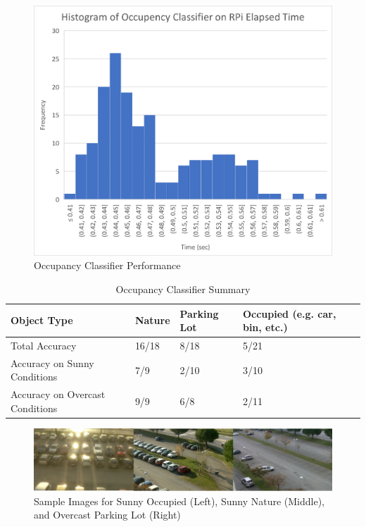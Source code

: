 \documentclass[12pt, titlepage]{article}
\begin{document}
\begin{figure}[h!]
  \begin{center} 
  \caption{Occupancy Classifier Performance}
  \label{fig:occClassifierPerf}
        \includegraphics[width=1\textwidth]{VnVReport/OccupencyClassifierPerformance.png}
  \end{center}
\end{figure}


\begin{table}[!h]
\begin{center}
\caption {Occupancy Classifier Summary}
\label{tab:OccClassifierSummary}
\begin{tabular}{ | m{5cm} | m{3cm} | m{3cm} | m{3cm} | } 
\hline
Object Type & Nature & Parking Lot & Occupied (e.g. car, bin, etc.) \\ 
\hline
Total Accuracy & 16/18 & 8/18 & 5/21 \\
\hline
Accuracy on Sunny Conditions & 7/9 & 2/10 & 3/10 \\
\hline
Accuracy on Overcast Conditions & 9/9 & 6/8 & 2/11 \\
\hline
\end{tabular}
\end{center}
\end{table}

\begin{figure}[h!]
  \begin{center} 
  \caption{Sample Images for Sunny Occupied (Left), Sunny Nature (Middle), and Overcast Parking Lot (Right)}
  \label{fig:sampleImages}
        \includegraphics[width=1\textwidth]{VnVReport/SampleImages.png}
  \end{center}
\end{figure}
\end{document}
